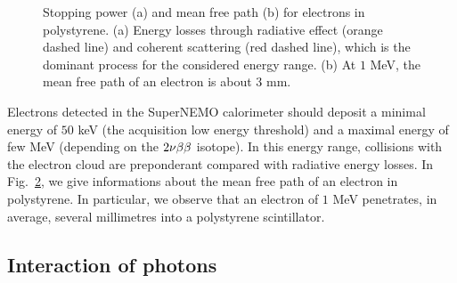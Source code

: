 \begin{figure}[h]
\begin{subfigure}[t]{0.48\textwidth}
    \captionsetup{justification=centering}
    \caption{\label{subfig:electron_free_path}}
  \end{subfigure}
  \caption{Stopping power (a) and mean free path (b) for electrons in polystyrene.
    (a) Energy losses through radiative effect (orange dashed line) and coherent scattering (red dashed line), which is the dominant process for the considered energy range.
    (b) At $1$ MeV, the mean free path of an electron is about $3$ mm.
  }
\end{figure}
Electrons detected in the SuperNEMO calorimeter should deposit a minimal energy of $50$ keV (the acquisition low energy threshold) and a maximal energy of few MeV (depending on the $2\nu\beta\beta$ isotope).
In this energy range, collisions with the electron cloud are preponderant compared with radiative energy losses.
In Fig.~\ref{subfig:electron_free_path}, we give informations about the mean free path of an electron in polystyrene.
In particular, we observe that an electron of $1$ MeV penetrates, in average, several millimetres into a polystyrene scintillator.


\subsection{Interaction of photons}

